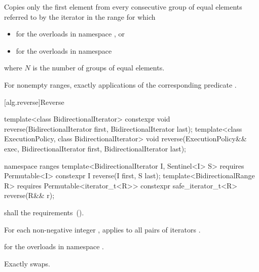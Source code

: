 \begin{itemdescr}
\pnum
\effects
Copies only the first element from every consecutive group of equal elements referred to by
the iterator
in the range
for which 

\pnum
\returns
{}
\begin{addedblock}
\begin{itemize}
\item {} for the overloads in namespace , or
\item {} for the overloads in namespace 
\end{itemize}
where $N$ is the number of groups of equal elements.
\end{addedblock}

\pnum
\complexity
For nonempty ranges, exactly
applications of the corresponding predicate
.
\end{itemdescr}


[alg.reverse]{Reverse}

%
\begin{itemdecl}
template<class BidirectionalIterator>
  constexpr void reverse(BidirectionalIterator first, BidirectionalIterator last);
template<class ExecutionPolicy, class BidirectionalIterator>
  void reverse(ExecutionPolicy&& exec,
               BidirectionalIterator first, BidirectionalIterator last);
\end{itemdecl}
\begin{addedblock}
\begin{itemdecl}
namespace ranges {
  template<BidirectionalIterator I, Sentinel<I> S>
    requires Permutable<I>
    constexpr I reverse(I first, S last);
  template<BidirectionalRange R>
    requires Permutable<iterator_t<R>>
    constexpr safe_iterator_t<R> reverse(R&& r);
}
\end{itemdecl}
\end{addedblock}

\begin{itemdescr}
\pnum
\requires
{}
 shall  the
 requirements~().

\pnum
\effects
For each non-negative integer
,
applies
to all pairs of iterators
.

\begin{addedblock}
\pnum
\returns
{} for the overloads in namespace .
\end{addedblock}

\pnum
\complexity
Exactly
swaps.
\end{itemdescr}


